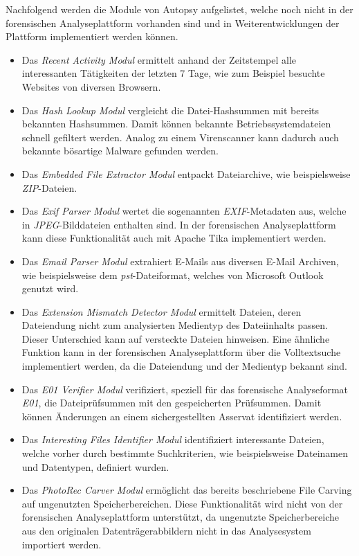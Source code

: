 \noindent
Nachfolgend werden die Module von Autopsy aufgelistet, welche noch nicht in der forensischen Analyseplattform vorhanden sind und in Weiterentwicklungen der Plattform implementiert werden können.
\begin{itemize}
\item Das \textit{Recent Activity Modul} ermittelt anhand der Zeitstempel alle interessanten Tätigkeiten der letzten 7 Tage, wie zum Beispiel besuchte Websites von diversen Browsern.
\item Das \textit{Hash Lookup Modul} vergleicht die Datei-Hashsummen mit bereits bekannten Hashsummen. Damit können bekannte Betriebssystemdateien schnell gefiltert werden. Analog zu einem Virenscanner kann dadurch auch bekannte bösartige Malware gefunden werden.
\item Das \textit{Embedded File Extractor Modul} entpackt Dateiarchive, wie beispielsweise \textit{ZIP}-Dateien.
\item Das \textit{Exif Parser Modul} wertet die sogenannten \textit{EXIF}-Metadaten aus, welche in \textit{JPEG}-Bilddateien enthalten sind. In der forensischen Analyseplattform kann diese Funktionalität auch mit Apache Tika implementiert werden.
\item Das \textit{Email Parser Modul} extrahiert E-Mails aus diversen E-Mail Archiven, wie beispielsweise dem \textit{\acrshort{pst}}-Dateiformat, welches von Microsoft Outlook genutzt wird.
\item Das \textit{Extension Mismatch Detector Modul} ermittelt Dateien, deren Dateiendung nicht zum analysierten Medientyp des Dateiinhalts passen. Dieser Unterschied kann auf versteckte Dateien hinweisen. Eine ähnliche Funktion kann in der forensischen Analyseplattform über die Volltextsuche implementiert werden, da die Dateiendung und der Medientyp bekannt sind.
\item Das \textit{E01 Verifier Modul} verifiziert, speziell für das forensische Analyseformat \textit{E01}, die Dateiprüfsummen mit den gespeicherten Prüfsummen. Damit können Änderungen an einem sichergestellten Asservat identifiziert werden.
\item Das \textit{Interesting Files Identifier Modul} identifiziert interessante Dateien, welche vorher durch bestimmte Suchkriterien, wie beispielsweise Dateinamen und Datentypen, definiert wurden.
\item Das \textit{PhotoRec Carver Modul} ermöglicht das bereits beschriebene File Carving auf ungenutzten Speicherbereichen. Diese Funktionalität wird nicht von der forensischen Analyseplattform unterstützt, da ungenutzte Speicherbereiche aus den originalen Datenträgerabbildern nicht in das Analysesystem importiert werden.

\end{itemize}
